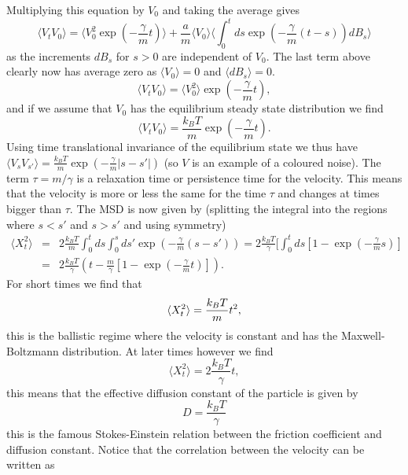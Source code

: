 \documentclass[11pt]{report}
\begin{document}
Multiplying this equation by $V_0$ and taking the average gives
\begin{equation}
\langle V_t V_0\rangle  = \langle V^2_0\exp(-\frac{\gamma}{m} t) \rangle + \frac{a}{m}\langle V_0\rangle \langle \int_0^t ds \exp\left(-\frac{\gamma}{m}(t-s)\right)dB_s\rangle
\end{equation}
as the increments $dB_s$ for $s>0$ are independent of $V_0$. The last term above clearly
now has average zero as $\langle V_0\rangle =0$ and  $\langle dB_s\rangle =0$.
\begin{equation}
\langle V_t V_0\rangle  = \langle V^2_0\rangle  \exp(-\frac{\gamma}{m} t),
\end{equation}
and if we assume that $V_0$ has the equilibrium steady state distribution we find
\begin{equation}
\langle V_t V_0\rangle  = \frac{k_BT}{m} \exp(-\frac{\gamma}{m} t).
\end{equation}
Using time translational invariance of the equilibrium state we thus have $\langle V_sV_{s'}\rangle =  \frac{k_BT}{m} \exp(-\frac{\gamma}{m} |s-s'|)$ (so $V$ is an example of a coloured noise). The term $\tau = m/\gamma$ 
is a relaxation time or persistence time for the velocity. This means that the velocity is more or less the same for the time $\tau$ and changes at times bigger than $\tau$. The MSD is now given by (splitting the integral into the regions where $s<s'$ and $s>s'$ and using symmetry)
\begin{eqnarray}
\langle X^2_t\rangle  &=& 2 \frac{k_BT}{m}\int_0^t ds \int_0^s ds'  \exp\left(-\frac{\gamma}{m} (s-s')\right)= 2 \frac{k_BT}{\gamma}[\int_0^t ds [1- \exp(-\frac{\gamma}{m} s) ]\nonumber \\
&=& 2 \frac{k_BT}{\gamma} \left(t - \frac{m}{\gamma}[1-\exp(-\frac{\gamma}{m} t)]\right).
\end{eqnarray}
For short times we find that
\begin{equation}
\langle X^2_t\rangle = {k_BT \over m}t^2,
\end{equation}
this is the ballistic regime where the velocity is constant and has the Maxwell-Boltzmann
distribution. At later times however we find
 \begin{equation}
\langle X^2_t\rangle  = 2 \frac{k_BT}{\gamma} t,
\end{equation}
this means that the effective diffusion constant of the particle is given by
\begin{equation}
D = \frac{k_BT}{\gamma} 
\end{equation}
this is the famous Stokes-Einstein relation between the friction coefficient and diffusion constant. Notice that the correlation between the velocity  can be written as
\end{document}
